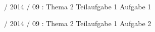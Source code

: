 \documentclass{lehramt-informatik}
\begin{document}
%

 / 2014 / 09 : Thema 2 Teilaufgabe 1 Aufgabe 1

%

 / 2014 / 09 : Thema 2 Teilaufgabe 1 Aufgabe 2

\literatur
\end{document}
